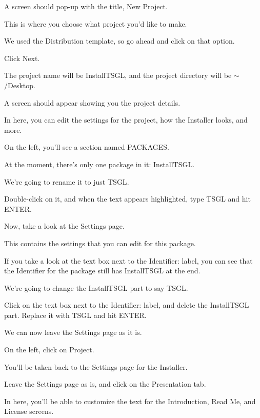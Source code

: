 A screen should pop-\/up with the title, {\ttfamily New Project}.

This is where you choose what project you'd like to make.

We used the {\ttfamily Distribution} template, so go ahead and click on that option.

Click {\ttfamily Next}.

The project name will be {\ttfamily Install\-T\-S\-G\-L}, and the project directory will be {\ttfamily $\sim$/\-Desktop}.

A screen should appear showing you the project details.

In here, you can edit the settings for the project, how the Installer looks, and more.

On the left, you'll see a section named {\ttfamily P\-A\-C\-K\-A\-G\-E\-S}.

At the moment, there's only one package in it\-: {\ttfamily Install\-T\-S\-G\-L}.

We're going to rename it to just {\ttfamily T\-S\-G\-L}.

Double-\/click on it, and when the text appears highlighted, type {\ttfamily T\-S\-G\-L} and hit {\ttfamily E\-N\-T\-E\-R}.

Now, take a look at the {\ttfamily Settings} page.

This contains the settings that you can edit for this package.

If you take a look at the text box next to the {\ttfamily Identifier\-:} label, you can see that the Identifier for the package still has {\ttfamily Install\-T\-S\-G\-L} at the end.

We're going to change the {\ttfamily Install\-T\-S\-G\-L} part to say {\ttfamily T\-S\-G\-L}.

Click on the text box next to the {\ttfamily Identifier\-:} label, and delete the {\ttfamily Install\-T\-S\-G\-L} part. Replace it with {\ttfamily T\-S\-G\-L} and hit {\ttfamily E\-N\-T\-E\-R}.

We can now leave the {\ttfamily Settings} page as it is.

On the left, click on {\ttfamily Project}.

You'll be taken back to the {\ttfamily Settings} page for the Installer.

Leave the {\ttfamily Settings} page as is, and click on the {\ttfamily Presentation} tab.

In here, you'll be able to customize the text for the {\ttfamily Introduction}, {\ttfamily Read Me}, and {\ttfamily License} screens.

